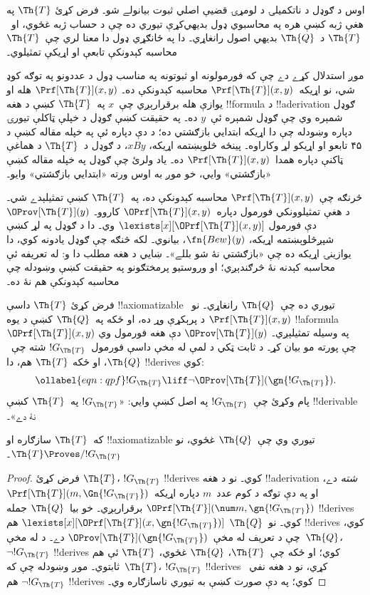\documentclass[../../../include/open-logic-section]{subfiles}
\begin{document}


اوس د ګوډل د ناتکميلۍ د لومړۍ قضيې اصلي ثبوت بيانولے شو۔ فرض کړئ
$\Th{T}$ په هغې ژبه کښې هره په محاسبوي ډول بديهي‌کړې تيوري ده چې
د حساب ژبه غځوي، او~$\Th{T}$ د~$\Th{Q}$ بديهي اصول رانغاړي۔ دا په
ځانګړي ډول دا معنا لري چې~$\Th{T}$ محاسبه کېدونکې تابعې او اړيکې
تمثيلوي۔

موږ استدلال کړے دے چې که فورمولونه او ثبوتونه په مناسب ډول د عددونو
په توګه کوډ شي، نو اړيکه~$\Prf[\Th{T}](x,y)$ محاسبه کېدونکې ده۔
$\Prf[\Th{T}](x,y)$ هله او يوازې هله برقرارېږي چې~$x$ په~$\Th{T}$
کښې د هغه !!{formula} د !!a{derivation} ګوډل شمېره وي چې ګوډل شمېره
ئې~$y$ ده۔ په حقيقت کښې ګوډل د خپلې ټاکلې تيورۍ دپاره وښودله چې
دا اړيکه ابتدايي بازګشتي ده؛ د دې دپاره ئې په خپله مقاله کښې د
۴۵ تابعو او اړيکو لړ وکاراوه۔ پينځه څلوېښتمه اړيکه، $x B y$، د
ګوډل د~$\Th{T}$ د هماغې ټاکنې دپاره همدا~$\Prf[\Th{T}](x,y)$ ده۔
ياد ولرئ چې ګوډل په خپله مقاله کښې «بازګشتي» وايي، خو موږ به اوس
ورته «ابتدايي بازګشتي» وايو۔

څرنګه چې~$\Prf[\Th{T}](x,y)$ محاسبه کېدونکې ده، په~$\Th{T}$ کښې
تمثيلېدے شي۔ د هغې تمثيلوونکي فورمول دپاره~$\OPrf[\Th{T}](x,y)$
کاروو۔ $\OProv[\Th{T}](y)$ دې فورمول
$\lexists[x][\OPrf[\Th{T}](x,y)]$ وي۔ دا د ګوډل په لړ کښې
شپږڅلوېښتمه اړيکه، $\fn{Bew}(y)$، بيانوي۔ لکه څنګه چې ګوډل يادونه
کوي، دا يوازينۍ اړيکه ده چې «بازګشتي نۀ شو بللے»۔ ښايي د هغه مطلب
دا و: له تعريفه ئې محاسبه کېدنه نۀ څرګندېږي؛ او وروستيو پرمختګونو
په حقيقت کښې وښودله چې محاسبه کېدونکې هم نۀ ده۔

فرض کړئ $\Th{T}$ داسې !!{axiomatizable} تيوري ده چې~$\Th{Q}$
رانغاړي۔ نو~$\Prf[\Th{T}](x, y)$ د پرېکړې وړ ده، او ځکه په~$\Th{Q}$
کښې د يوه !!a{formula}~$\OPrf[\Th{T}](x, y)$ په وسيله تمثيلېږي۔
$\OProv[\Th{T}](y)$ دې هغه فورمول وي چې پورته مو بيان کړ۔ د ثابت
ټکي د لمې له مخې داسې فورمول~$!G_\Th{T}$ شته چې~$\Th{Q}$، او ځکه
$\Th{T}$ هم، دا !!{derive}s کوي:
\begin{equation}
\ollabel{eqn:qpf}
!G_\Th{T} \liff \lnot \OProv[\Th{T}](\gn{!G_\Th{T}}).
\end{equation}
پام وکړئ چې~$!G_\Th{T}$ په اصل کښې وايي: «$!G_\Th{T}$ په~$\Th{T}$
کښې !!{derivable} نۀ دے»۔

\begin{lem}
که~$\Th{T}$ سازګاره او !!{axiomatizable} تيوري وي چې~$\Th{Q}$
غځوي، نو $\Th{T} \Proves/ !G_\Th{T}$۔
\end{lem}

\begin{proof}
فرض کړئ $\Th{T}$، $!G_\Th{T}$ !!{derive}s کوي۔ نو د هغه
!!a{derivation} \emph{شته} دے، او په دې توګه د کوم عدد~$m$ دپاره
اړيکه~$\Prf[\Th{T}](m,
\Gn{!G_\Th{T}})$ برقرارېږي۔ خو بيا~$\Th{Q}$ جمله
$\OPrf[\Th{T}](\num m, \gn{!G_\Th{T}})$ !!{derive}s کوي۔ نو~$\Th{Q}$
$\lexists[x][\OPrf[\Th{T}](x,\gn{!G_\Th{T}})]$ هم !!{derive}s کوي،
چې د تعريف له مخې~$\OProv[\Th{T}](\gn{!G_\Th{T}})$ دے۔ د
 له مخې~$\Th{Q}$، $\lnot !G_\Th{T}$ !!{derive}s کوي؛
او ځکه چې~$\Th{T}$، $\Th{Q}$ غځوي، $\Th{T}$ ئې هم ثابتوي۔
موږ وښودله چې که~$\Th{T}$، $!G_\Th{T}$ !!{derive}s کړي، نو د هغه
نفي~$\lnot !G_\Th{T}$ هم !!{derive}s کوي؛ په دې صورت کښې به تيوري
ناسازګاره وي۔
\end{proof}
\end{document}
